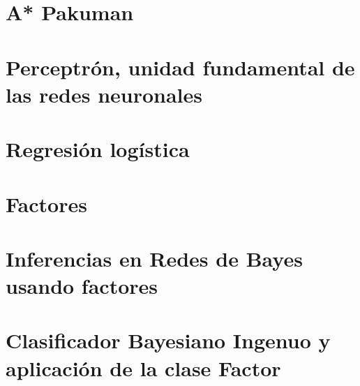 \documentclass[12pt,openany]{book}
\begin{document}
\chapter{A* Pakuman}






\chapter[Perceptrón]{Perceptrón, unidad fundamental de las redes neuronales}






\chapter{Regresión logística}






\chapter{Factores}





\chapter[Inferencia]{Inferencias en Redes de Bayes usando factores}





\chapter[Bayes Ingenuo]{Clasificador Bayesiano Ingenuo y aplicación de la clase Factor}


\end{document}
